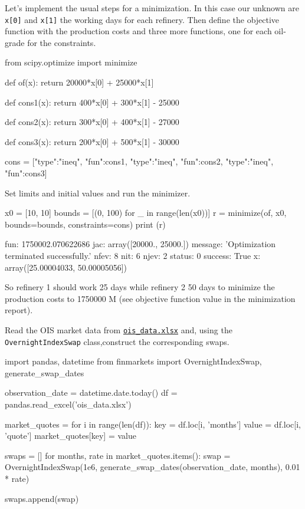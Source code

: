 \cprotEnv\begin{solution}
Let's implement the usual steps for a minimization. In this case our unknown are \texttt{x[0]} and \texttt{x[1]} the working days for each refinery. Then define the objective function with the production costs and three more functions, one for each oil-grade for the constraints.

\begin{ipython}
from scipy.optimize import minimize

def of(x):
    return 20000*x[0] + 25000*x[1]

def cons1(x):
    return 400*x[0] + 300*x[1] - 25000

def cons2(x):
    return 300*x[0] + 400*x[1] - 27000

def cons3(x):
    return 200*x[0] + 500*x[1] - 30000

cons = [{"type":"ineq", "fun":cons1},
        {"type":"ineq", "fun":cons2},
        {"type":"ineq", "fun":cons3}]
\end{ipython}
Set limits and initial values and run the minimizer.
\begin{ipython}
x0 = [10, 10]
bounds = [(0, 100) for _ in range(len(x0))]
r = minimize(of, x0, bounds=bounds, constraints=cons)
print (r)
\end{ipython}
\begin{ioutput}
     fun: 1750002.070622686
     jac: array([20000., 25000.])
 message: 'Optimization terminated successfully.'
    nfev: 8
     nit: 6
    njev: 2
  status: 0
 success: True
       x: array([25.00004033, 50.00005056])
\end{ioutput}    
So refinery 1 should work 25 days while refinery 2 50 days to minimize the production costs to 1750000 M (see objective function value in the minimization report).
\end{solution}

\begin{question}
Read the OIS market data from \href{https://github.com/matteosan1/finance_course/blob/develop/libro/input_files/ois_data.xlsx}{\texttt{ois\_data.xlsx}} and, using the \texttt{OvernightIndexSwap} class,construct the corresponding swaps.
\end{question}

\cprotEnv\begin{solution}

\begin{ipython}
import pandas, datetime
from finmarkets import OvernightIndexSwap, generate_swap_dates

observation_date = datetime.date.today()
df = pandas.read_excel('ois_data.xlsx')

market_quotes = {}
for i in range(len(df)):
    key = df.loc[i, 'months']
    value = df.loc[i, 'quote']
    market_quotes[key] = value

swaps = []
for months, rate in market_quotes.items():
    swap = OvernightIndexSwap(1e6,
        generate_swap_dates(observation_date, months),
        0.01 * rate)

swaps.append(swap)
\end{ipython}
\end{solution}

